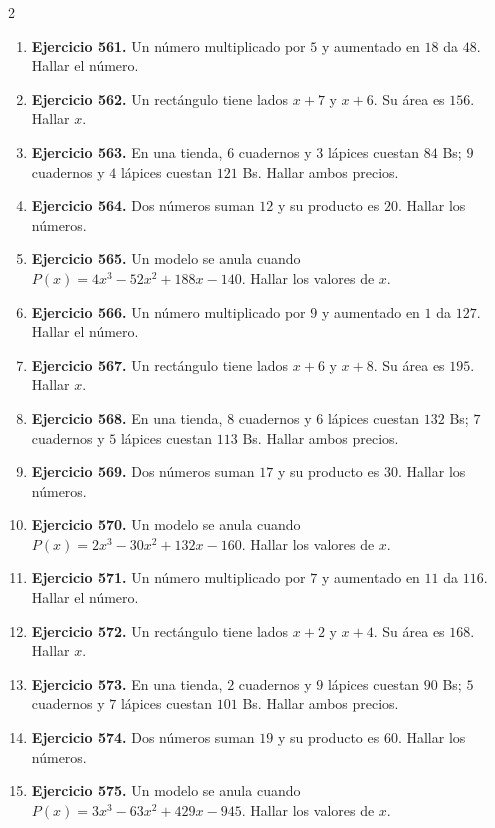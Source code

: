 \documentclass[10pt,a4paper]{article}
\begin{document}
\begin{multicols}{2}
\begin{enumerate}[label=\textbf{\arabic*.}]
\item \textbf{Ejercicio 561.} Un número multiplicado por \(5\) y aumentado en \(18\) da \(48\). Hallar el número.
\item \textbf{Ejercicio 562.} Un rectángulo tiene lados \(x+7\) y \(x+6\). Su área es \(156\). Hallar \(x\).
\item \textbf{Ejercicio 563.} En una tienda, \(6\) cuadernos y \(3\) lápices cuestan \(84\) Bs; \(9\) cuadernos y \(4\) lápices cuestan \(121\) Bs. Hallar ambos precios.
\item \textbf{Ejercicio 564.} Dos números suman \(12\) y su producto es \(20\). Hallar los números.
\item \textbf{Ejercicio 565.} Un modelo se anula cuando \(P(x)=4 x^{3} - 52 x^{2} + 188 x - 140\). Hallar los valores de \(x\).
\item \textbf{Ejercicio 566.} Un número multiplicado por \(9\) y aumentado en \(1\) da \(127\). Hallar el número.
\item \textbf{Ejercicio 567.} Un rectángulo tiene lados \(x+6\) y \(x+8\). Su área es \(195\). Hallar \(x\).
\item \textbf{Ejercicio 568.} En una tienda, \(8\) cuadernos y \(6\) lápices cuestan \(132\) Bs; \(7\) cuadernos y \(5\) lápices cuestan \(113\) Bs. Hallar ambos precios.
\item \textbf{Ejercicio 569.} Dos números suman \(17\) y su producto es \(30\). Hallar los números.
\item \textbf{Ejercicio 570.} Un modelo se anula cuando \(P(x)=2 x^{3} - 30 x^{2} + 132 x - 160\). Hallar los valores de \(x\).
\item \textbf{Ejercicio 571.} Un número multiplicado por \(7\) y aumentado en \(11\) da \(116\). Hallar el número.
\item \textbf{Ejercicio 572.} Un rectángulo tiene lados \(x+2\) y \(x+4\). Su área es \(168\). Hallar \(x\).
\item \textbf{Ejercicio 573.} En una tienda, \(2\) cuadernos y \(9\) lápices cuestan \(90\) Bs; \(5\) cuadernos y \(7\) lápices cuestan \(101\) Bs. Hallar ambos precios.
\item \textbf{Ejercicio 574.} Dos números suman \(19\) y su producto es \(60\). Hallar los números.
\item \textbf{Ejercicio 575.} Un modelo se anula cuando \(P(x)=3 x^{3} - 63 x^{2} + 429 x - 945\). Hallar los valores de \(x\).

\end{enumerate}
\end{multicols}
\end{document}

